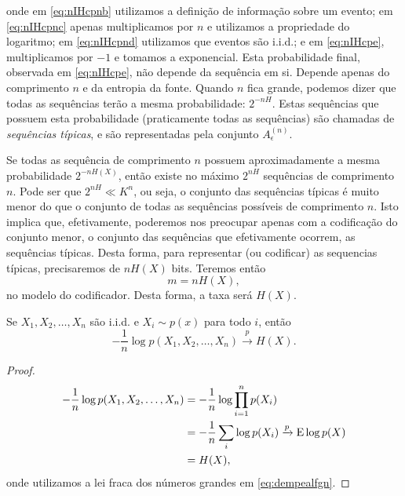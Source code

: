 onde em \ref{eq:nIHcpnb} utilizamos a definição de informação sobre um evento;
em \ref{eq:nIHcpnc} apenas multiplicamos por $n$ e utilizamos a propriedade do logaritmo; em \ref{eq:nIHcpnd} utilizamos
que eventos são i.i.d.; e em \ref{eq:nIHcpe}, multiplicamos por $-1$ e tomamos a exponencial.
Esta probabilidade final, observada em \ref{eq:nIHcpe}, não depende da sequência em si. Depende apenas do comprimento $n$ e
da entropia da fonte.
Quando $n$ fica grande, podemos dizer que todas as sequências terão a mesma probabilidade: $2^{-nH}$.
Estas sequências que possuem esta probabilidade (praticamente todas as sequências) são
chamadas de \emph{sequências típicas}, e são representadas pela conjunto $A_\epsilon^{(n)}$.

Se todas as sequência de comprimento $n$ possuem aproximadamente a mesma probabilidade $2^{-nH(X)}$,
então existe no máximo $2^{nH}$ sequências de comprimento $n$. Pode ser que $2^{nH} \ll K^n$,
ou seja, o conjunto das sequências típicas é muito menor do que o conjunto de todas as sequências
possíveis de comprimento $n$. Isto implica que, efetivamente, poderemos nos preocupar apenas
com a codificação do conjunto menor, o conjunto das sequências que efetivamente ocorrem, as sequências
típicas. Desta forma, para representar (ou codificar) as sequencias típicas, precisaremos de
$nH(X)$ bits. Teremos então
\begin{equation}
m = nH(X),
\end{equation}
no modelo do codificador. Desta forma, a taxa será $H(X)$.


\begin{theorem}\label{thm-prop-eqp-ass}
  Se $X_1, X_2, \ldots, X_n$ são i.i.d. e $X_i \sim p(x)$ para todo $i$, então
  \begin{equation}\label{eq-pX1X2Xn-H}
  -\frac{1}{n} \log p(X_1, X_2, \ldots, X_n) \xrightarrow{p} H(X) .
  \end{equation}
\end{theorem}
\begin{proof}
  \begin{subequations}
  \begin{align}
  -\frac{1}{n} \log p(X_1, X_2, \ldots, X_n) &= - \frac{1}{n} \log \prod_{i=1}^n p(X_i) \\
                                            &= - \frac{1}{n} \sum_i \log p(X_i) \xrightarrow{p} \E \log p(X) \label{eq:dempealfgn}\\
                                             &= H(X) ,
  \end{align}
  \end{subequations}
  onde utilizamos a lei fraca dos números grandes em \ref{eq:dempealfgn}.
  \end{proof}



